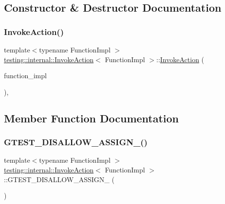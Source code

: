 \subsection{Constructor \& Destructor Documentation}
\mbox{\label{classtesting_1_1internal_1_1_invoke_action_a786ce772624fc87a31891f465df7ce61}} 
\subsubsection{\texorpdfstring{InvokeAction()}{InvokeAction()}}
{\footnotesize\ttfamily template$<$typename Function\+Impl $>$ \\
\mbox{\hyperlink{classtesting_1_1internal_1_1_invoke_action}{testing\+::internal\+::\+Invoke\+Action}}$<$ Function\+Impl $>$\+::\mbox{\hyperlink{classtesting_1_1internal_1_1_invoke_action}{Invoke\+Action}} (\begin{DoxyParamCaption}\item[{Function\+Impl}]{function\+\_\+impl }\end{DoxyParamCaption})\hspace{0.3cm}{\ttfamily [inline]}, {\ttfamily [explicit]}}



\subsection{Member Function Documentation}
\mbox{\label{classtesting_1_1internal_1_1_invoke_action_a7fc4b4fad2b22e50dd818db00a8d7bb9}} 
\subsubsection{\texorpdfstring{GTEST\_DISALLOW\_ASSIGN\_()}{GTEST\_DISALLOW\_ASSIGN\_()}}
{\footnotesize\ttfamily template$<$typename Function\+Impl $>$ \\
\mbox{\hyperlink{classtesting_1_1internal_1_1_invoke_action}{testing\+::internal\+::\+Invoke\+Action}}$<$ Function\+Impl $>$\+::G\+T\+E\+S\+T\+\_\+\+D\+I\+S\+A\+L\+L\+O\+W\+\_\+\+A\+S\+S\+I\+G\+N\+\_\+ (\begin{DoxyParamCaption}\item[{\mbox{\hyperlink{classtesting_1_1internal_1_1_invoke_action}{Invoke\+Action}}$<$ Function\+Impl $>$}]{ }\end{DoxyParamCaption})\hspace{0.3cm}{\ttfamily [private]}}

